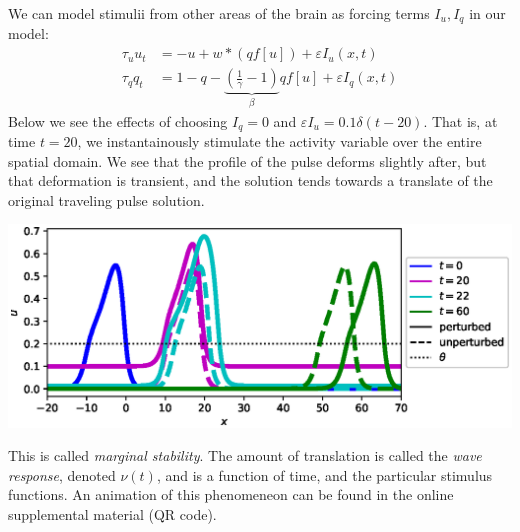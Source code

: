 \documentclass[landscape,final]{baposter}
\begin{document}
\begin{poster}
{	We can model stimulii from other areas of the brain as forcing terms $I_u, I_q$ in our model:
	\begin{align*}
		\tau_u u_t &= -u + w * (q f[u]) + \varepsilon I_u(x, t)\\
		\tau_q q_t &= 1 - q - \underbrace{(\tfrac{1}{\gamma} - 1)}_{\beta} q f[u] + \varepsilon I_q(x, t)
	\end{align*}
	Below we see the effects of choosing $I_q = 0$ and $\varepsilon I_u = 0.1 \delta(t-20)$. That is, at time $t=20$, we instantainously stimulate the activity variable over the entire spatial domain. We see that the profile of the pulse deforms slightly after, but that deformation is transient, and the solution tends towards a translate of the original traveling pulse solution. 
	\begin{center}
		\includegraphics[width=.7\linewidth]{response_example}
	\end{center}
	This is called \textit{marginal stability}. The amount of translation is called the \textit{wave response}, denoted $\nu(t)$, and is a function of time, and the particular stimulus functions. An animation of this phenomeneon can be found in the online supplemental material (QR code).
	\vspace{.2cm}
}


\end{poster}
\end{document}
